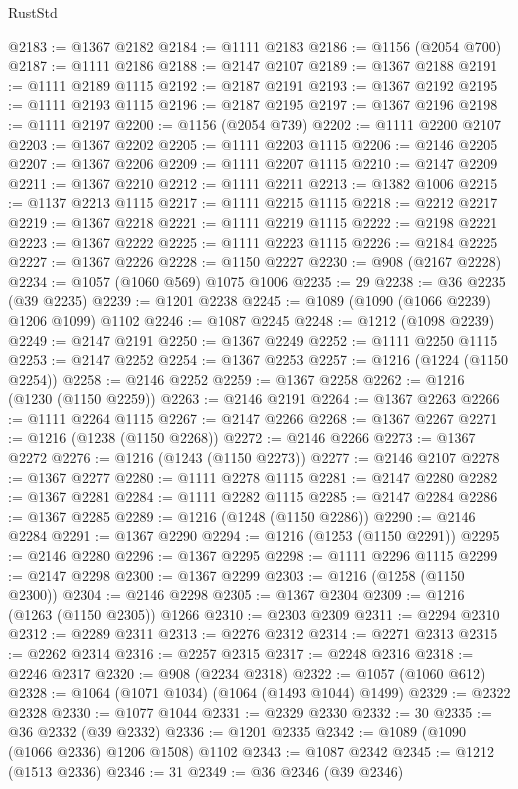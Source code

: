 \begin{lexlean}{RustStd}
\begin{coremodule}
@2183 := @1367 @2182
@2184 := @1111 @2183
@2186 := @1156 (@2054 @700)
@2187 := @1111 @2186
@2188 := @2147 @2107
@2189 := @1367 @2188
@2191 := @1111 @2189 @1115
@2192 := @2187 @2191
@2193 := @1367 @2192
@2195 := @1111 @2193 @1115
@2196 := @2187 @2195
@2197 := @1367 @2196
@2198 := @1111 @2197
@2200 := @1156 (@2054 @739)
@2202 := @1111 @2200 @2107
@2203 := @1367 @2202
@2205 := @1111 @2203 @1115
@2206 := @2146 @2205
@2207 := @1367 @2206
@2209 := @1111 @2207 @1115
@2210 := @2147 @2209
@2211 := @1367 @2210
@2212 := @1111 @2211
@2213 := @1382 @1006
@2215 := @1137 @2213 @1115
@2217 := @1111 @2215 @1115
@2218 := @2212 @2217
@2219 := @1367 @2218
@2221 := @1111 @2219 @1115
@2222 := @2198 @2221
@2223 := @1367 @2222
@2225 := @1111 @2223 @1115
@2226 := @2184 @2225
@2227 := @1367 @2226
@2228 := @1150 @2227
@2230 := @908 (@2167 @2228)
@2234 := @1057 (@1060 @569) @1075 @1006
@2235 := 29
@2238 := @36 @2235 (@39 @2235)
@2239 := @1201 @2238
@2245 := @1089 (@1090 (@1066 @2239) @1206 @1099) @1102
@2246 := @1087 @2245
@2248 := @1212 (@1098 @2239)
@2249 := @2147 @2191
@2250 := @1367 @2249
@2252 := @1111 @2250 @1115
@2253 := @2147 @2252
@2254 := @1367 @2253
@2257 := @1216 (@1224 (@1150 @2254))
@2258 := @2146 @2252
@2259 := @1367 @2258
@2262 := @1216 (@1230 (@1150 @2259))
@2263 := @2146 @2191
@2264 := @1367 @2263
@2266 := @1111 @2264 @1115
@2267 := @2147 @2266
@2268 := @1367 @2267
@2271 := @1216 (@1238 (@1150 @2268))
@2272 := @2146 @2266
@2273 := @1367 @2272
@2276 := @1216 (@1243 (@1150 @2273))
@2277 := @2146 @2107
@2278 := @1367 @2277
@2280 := @1111 @2278 @1115
@2281 := @2147 @2280
@2282 := @1367 @2281
@2284 := @1111 @2282 @1115
@2285 := @2147 @2284
@2286 := @1367 @2285
@2289 := @1216 (@1248 (@1150 @2286))
@2290 := @2146 @2284
@2291 := @1367 @2290
@2294 := @1216 (@1253 (@1150 @2291))
@2295 := @2146 @2280
@2296 := @1367 @2295
@2298 := @1111 @2296 @1115
@2299 := @2147 @2298
@2300 := @1367 @2299
@2303 := @1216 (@1258 (@1150 @2300))
@2304 := @2146 @2298
@2305 := @1367 @2304
@2309 := @1216 (@1263 (@1150 @2305)) @1266
@2310 := @2303 @2309
@2311 := @2294 @2310
@2312 := @2289 @2311
@2313 := @2276 @2312
@2314 := @2271 @2313
@2315 := @2262 @2314
@2316 := @2257 @2315
@2317 := @2248 @2316
@2318 := @2246 @2317
@2320 := @908 (@2234 @2318)
@2322 := @1057 (@1060 @612)
@2328 := @1064 (@1071 @1034) (@1064 (@1493 @1044) @1499)
@2329 := @2322 @2328
@2330 := @1077 @1044
@2331 := @2329 @2330
@2332 := 30
@2335 := @36 @2332 (@39 @2332)
@2336 := @1201 @2335
@2342 := @1089 (@1090 (@1066 @2336) @1206 @1508) @1102
@2343 := @1087 @2342
@2345 := @1212 (@1513 @2336)
@2346 := 31
@2349 := @36 @2346 (@39 @2346)

\end{coremodule}
\end{lexlean}
